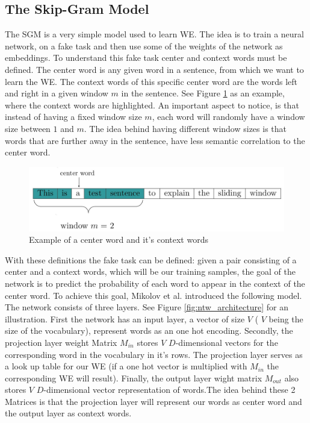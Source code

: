 \subsection{The Skip-Gram Model}
The SGM is a very simple model used to learn WE. The idea is to train a neural network, on a fake task and then use some of the weights of the network as embeddings. To understand this fake task center and context words must be defined. The center word is any given word in a sentence, from which we want to learn the WE. The context words of this specific center word are the words left and right in a given window $m$ in the sentence. See Figure \ref{fig:window_ex} as an example, where the context words are highlighted. An important aspect to notice, is that instead of having a fixed window size $m$, each word will randomly have a window size between $1$ and $m$. The idea behind having different window sizes is that words that are further away in the sentence, have less semantic correlation to the center word.

\begin{figure}[h]
\centering
\includegraphics[scale=0.18]{images/window_ex}
\caption{Example of a center word and it's context words}
\label{fig:window_ex}
\end{figure}
With these definitions the fake task can be defined: given a pair consisting of a center and a context words, which will be our training samples, the goal of the network is to predict the probability of each word to appear in the context of the center word. To achieve this goal, Mikolov et al. introduced the following model. The network consists of three layers. See Figure \ref{fig:ntw_architecture} for an illustration. First the network has an input layer, a vector of size $V$ ( $V$ being the size of the vocabulary), represent words as an one hot encoding. Secondly, the projection layer weight Matrix $M_{in}$ stores $V$ $D$-dimensional vectors for the corresponding word in the vocabulary  in it's rows. The projection layer serves as a look up table for our WE (if a one hot vector is multiplied with $M_{in}$ the corresponding WE will result). Finally, the output layer wight matrix $M_{out}$ also stores $V$ $D$-dimensional vector representation of words.The idea behind these 2 Matrices is that the projection layer will represent our words as center word and the output layer as context words. 

